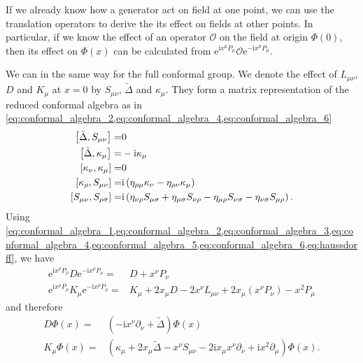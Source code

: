\documentclass[10pt]{article}
\newcommand{\me}{\mathrm{e}}
\newcommand{\ii}{\mathrm{i}}
\begin{document}
\begin{remark}
    If we already know how a generator act on field at one point, we can use the translation operators to derive the its effect on fields at other points.
    In particular, if we know the effect of an operator $\mathcal{O}$ on the field at origin $\Phi(0)$, then its effect on $\Phi(x)$ can be calculated from $\me^{\ii x^\mu P_\mu}\mathcal{O}\me^{-\ii x^\mu P_\mu}$.
\end{remark}
We can in the same way for the full conformal group.
We denote the effect of $L_{\mu\nu}$, $D$ and $K_\mu$ at $x=0$ by $S_{\mu\nu}$, $\tilde{\Delta}$ and $\kappa_\mu$.
They form a matrix representation of the reduced conformal algebra as in \cref{eq:conformal_algebra_2,eq:conformal_algebra_4,eq:conformal_algebra_6}
\begin{subequations}
    \begin{align}
        \comm{\tilde{\Delta}}{S_{\mu\nu}}= & 0\label{eq:conformal_matrix_1}                                                                                                   \\
        \comm{\tilde{\Delta}}{\kappa_\mu}= & -\ii\kappa_\mu                                                                                                                   \\
        \comm{\kappa_\nu}{\kappa_\mu}=     & 0                                                                                                                                \\
        \comm{\kappa_\rho}{S_{\mu\nu}}=    & \ii\left(\eta_{\rho\mu}\kappa_{\nu}-\eta_{\rho\nu}\kappa_\mu\right)                                                              \\
        \comm{S_{\mu\nu}}{S_{\rho\sigma}}= & \ii\left(\eta_{\nu\rho}S_{\mu\sigma}+\eta_{\mu\sigma}S_{\nu\rho}-\eta_{\mu\rho}S_{\nu\sigma}-\eta_{\nu\sigma}S_{\mu\rho}\right).
    \end{align}
\end{subequations}
Using \cref{eq:conformal_algebra_1,eq:conformal_algebra_2,eq:conformal_algebra_3,eq:conformal_algebra_4,eq:conformal_algebra_5,eq:conformal_algebra_6,eq:haussdorff}, we have
\begin{align}
    \me^{\ii x^\rho P_\rho}D\me^{-\ii x^\rho P_\rho}=     & D+x^\nu P_\nu                                                             \\
    \me^{\ii x^\rho P_\rho}K_\mu\me^{-\ii x^\rho P_\rho}= & K_\mu+2x_\mu D-2x^\nu L_{\mu\nu}+2x_\mu\left(x^\nu P_\nu\right)-x^2 P_\mu
\end{align}
and therefore
\begin{align}
    D\Phi(x)=     & \left(-\ii x^\nu\partial_\nu+\tilde{\Delta}\right)\Phi(x)\label{eq:representation:dilation_operator}                    \\
    K_\mu\Phi(x)= & \left(\kappa_\mu+2x_\mu\tilde{\Delta}-x^\nu S_{\mu\nu}-2\ii x_\mu x^\nu\partial_\nu+\ii x^2 \partial_\mu\right)\Phi(x).
\end{align}
\end{document}
